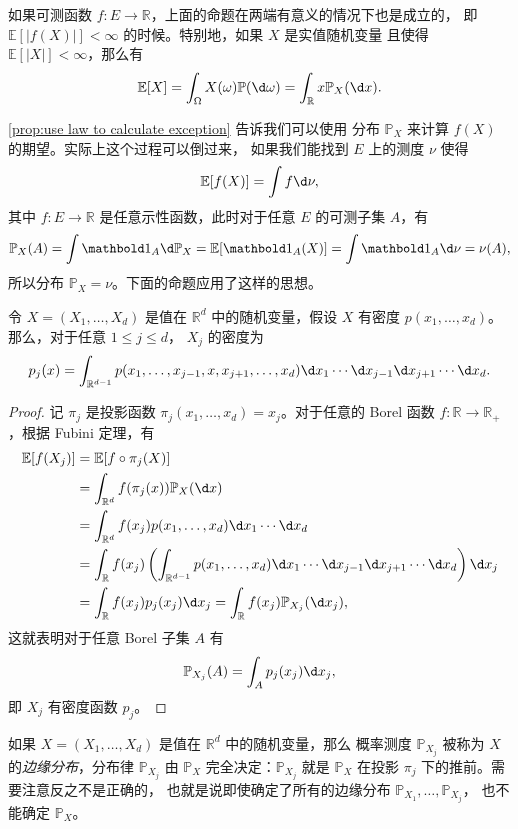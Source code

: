 \documentclass[fontset=none]{Notes}
\newcommand{\indicator}[1]{\mathbold 1_{#1}}
\begin{document}
如果可测函数 $f:E\to \mathbb{R}$，上面的命题在两端有意义的情况下也是成立的，
即 $\mathbb{E}[|f(X)|]<\infty$ 的时候。特别地，如果 $X$ 是实值随机变量
且使得 $\mathbb{E}[|X|]<\infty$，那么有
\[
  \mathbb{E}[X]  =\int_{\Omega} X(\omega)\mathbb{P}(\d\omega)
  =\int_{\mathbb{R}} x \mathbb{P}_X(\d x).
\]

\autoref{prop:use law to calculate exception} 告诉我们可以使用
分布 $\mathbb{P}_X$ 来计算 $f(X)$ 的期望。实际上这个过程可以倒过来，
如果我们能找到 $E$ 上的测度 $\nu$ 使得
\[
  \mathbb{E}[f(X)]=\int f\d\nu,  
\]
其中 $f:E\to \mathbb{R}$ 是任意示性函数，此时对于任意
$E$ 的可测子集 $A$，有
\[
  \mathbb{P}_X(A)=\int \indicator{A} \d \mathbb{P}_X=\mathbb{E}[\indicator{A}(X)]=  \int \indicator{A}\d\nu=\nu(A),
\]
所以分布 $\mathbb{P}_X=\nu$。下面的命题应用了这样的思想。

\begin{proposition}
  令 $X=(X_1,\dots,X_d)$ 是值在 $\mathbb{R}^d$ 中的随机变量，假设
  $X$ 有密度 $p(x_1,\dots,x_d)$。那么，对于任意 $1\leq j\leq d$，
  $X_j$ 的密度为
  \[
    p_j(x)=\int_{\mathbb{R}^{d-1}}p(x_1,\dots,x_{j-1},x,x_{j+1},\dots,x_d)
    \d x_1\cdots \d x_{j-1}\d x_{j+1}\cdots \d x_d.  
  \]
\end{proposition}
\begin{proof}
  记 $\pi_j$ 是投影函数 $\pi_j(x_1,\dots,x_d)=x_j$。对于任意的
  Borel 函数 $f:\mathbb{R}\to \mathbb{R}_+$，根据 Fubini 定理，有
  \begin{align*}
    \mathbb{E}[f(X_j)]&=\mathbb{E}[f\circ\pi_j(X)]\\
    &=\int_{\mathbb{R}^d}f(\pi_j(x)) \mathbb{P}_X(\d x)\\
    &=\int_{\mathbb{R}^d}f(x_j)p(x_1,\dots,x_d) \d x_1\cdots\d x_d \\
    &=\int_{\mathbb{R}}f(x_j)\left(
      \int_{\mathbb{R}^{d-1}}p(x_1,\dots,x_d)\d x_1\cdots
      \d x_{j-1}\d x_{j+1}\cdots \d x_d
    \right)\d x_j\\
    &=\int_{\mathbb{R}}f(x_j)p_j(x_j)\d x_j
    =\int_{\mathbb{R}}f(x_j) \mathbb{P}_{X_j}(\d x_j),
  \end{align*}
  这就表明对于任意 Borel 子集 $A$ 有
  \[
    \mathbb{P}_{X_j}(A)=\int_A p_j(x_j)\d x_j,  
  \]
  即 $X_j$ 有密度函数 $p_j$。 
\end{proof}

如果 $X=(X_1,\dots,X_d)$ 是值在 $\mathbb{R}^d$ 中的随机变量，那么
概率测度 $\mathbb{P}_{X_j}$ 被称为 $X$ 的\emph{边缘分布}，分布律
$\mathbb{P}_{X_j}$ 由 $\mathbb{P}_X$ 完全决定：$\mathbb{P}_{X_j}$
就是 $\mathbb{P}_X$ 在投影 $\pi_j$ 下的推前。需要注意反之不是正确的，
也就是说即使确定了所有的边缘分布 $\mathbb{P}_{X_1},\dots,\mathbb{P}_{X_j}$，
也不能确定 $\mathbb{P}_X$。
 
\end{document}

